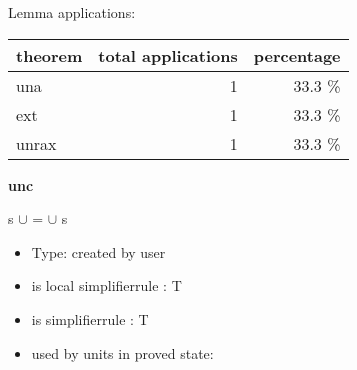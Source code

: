 \documentclass[a4paper]{article}
\begin{document}
Lemma applications:

\begin{supertabular}{l|r|r}
theorem	        & total applications & percentage \\ \hline
una & 1 & 33.3 \% \\
ext & 1 & 33.3 \% \\
unrax & 1 & 33.3 \% \\

\end{supertabular}
\pagebreak

{\LARGE\bf unc}\label{lemma-unc}

\medskip

 \Fol s $\cup$  =  $\cup$ s

\begin{itemize}

\item Type: created by user

\item is local simplifierrule : T
\item is simplifierrule : T
\item used by units in proved state:


\end{itemize}
\end{document}

